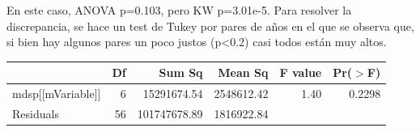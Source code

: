 En este caso, ANOVA p=0.103, pero KW p=3.01e-5. Para resolver la discrepancia, se hace un test de Tukey por pares de años en el que se observa que, si bien hay algunos pares un poco justos (p<0.2) casi todos están muy altos.

\begin{table}[ht]
\centering
\begin{tabular}{lrrrrr}
  \hline
 & Df & Sum Sq & Mean Sq & F value & Pr($>$F) \\ 
  \hline
mdsp[[mVariable]] & 6 & 15291674.54 & 2548612.42 & 1.40 & 0.2298 \\ 
  Residuals         & 56 & 101747678.89 & 1816922.84 &  &  \\ 
   \hline
\end{tabular}
\end{table}

